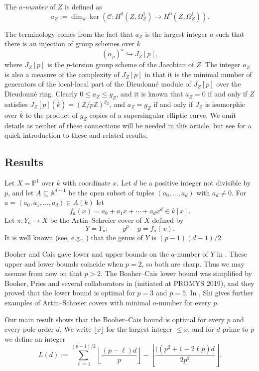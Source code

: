 \documentclass[12pt,reqno]{amsart}
\numberwithin{equation}{section}
\theoremstyle{plain}
\theoremstyle{definition}
\theoremstyle{remark}
\numberwithin{equation}{section}
\newcommand{\CC}{\mathcal{C}}
\newcommand{\kbar}{{\overline{k}}}
\newcommand{\Z}{\mathbb{Z}}
\newcommand{\A}{\mathbb{A}}
\renewcommand{\P}{\mathbb{P}}
\newcommand{\<}{\langle}
\renewcommand{\>}{\rangle}
\newcommand{\into}{\hookrightarrow}
\begin{document}
The \emph{$a$-number} of $Z$ is defined as
\[a_Z:=\dim_k\ker\left(\CC: H^0(Z,\Omega^1_Z)
    \to H^0(Z,\Omega^1_Z)\right).\]

The terminology comes from the fact that $a_Z$ is the largest integer
$a$ such that there is an injection of group schemes over $k$
\[\left(\alpha_p\right)^a\into J_Z[p],\]
where $J_Z[p]$ is the $p$-torsion group scheme of the Jacobian of $Z$.
The integer $a_Z$ is also a measure of the complexity of $J_Z[p]$ in
that it is the minimal number of generators of the local-local part of
the Dieudonn\'e module of $J_Z[p]$ over the Dieudonn\'e ring.  Clearly
$0\le a_Z\le g_Z$, and it is known that $a_Z=0$ if and only if $Z$
satisfies $J_Z[p](\kbar)=(\Z/p\Z)^{g_Z}$, and $a_Z=g_Z$ if and only if
$J_Z$ is isomorphic over $\kbar$ to the product of $g_Z$ copies of a
supersingular elliptic curve.
We omit details as neither of these connections will be needed in this
article, but see \cite{Pries08} for a quick introduction to these and
related results.

\subsection{Results}
Let $X=\P^1$ over $k$ with coordinate $x$.  Let $d$ be a positive
integer not divisible by $p$, and let $A\subseteq\A^{d+1}$ be the open
subset of tuples $(a_0,\dots,a_d)$ with $a_d\neq0$.  For
$a=(a_0,a_1,\dots,a_d)\in A(k)$ let
\[f_a(x)=a_0+a_1x+\cdots+a_dx^d\in k[x].\]
Let $\pi:Y_a\to X$ be the Artin--Schreier cover of $X$ defined by
\[Y=Y_a:\qquad y^p-y=f_a(x).\]
It is well known (see, e.g., \cite[Prop.~6.4.1]{StichtenothAFFC}) that
the genus of $Y$ is $(p-1)(d-1)/2$. 

Booher and Cais gave lower and upper bounds on the $a$-number of $Y$
in \cite{BooherCais20}.  These upper and lower bounds coincide when
$p=2$, so both are sharp.  Thus we may assume from now on that $p>2$.
The Booher--Cais lower bound was simplified by Booher, Pries and
several collaborators in \cite{BooherPriesetal22} (initiated at PROMYS
2019), and they proved that the lower bound is optimal for $p=3$ and
$p=5$.  In \cite{Shi26}, Shi gives further examples of Artin--Schreier
covers with minimal $a$-number for every $p$. 

Our main result shows that the Booher--Cais bound is optimal for every
$p$ and every pole order $d$.  We write $\lfloor x \rfloor$ for the
largest integer $\le x$, and for $d$ prime to $p$ we define an integer
\[L(d):=\sum_{\ell=1}^{(p-1)/2}
    \left\lfloor\frac{(p-\ell)d}{p}\right\rfloor
    -\left\lfloor\frac{((p^2+1-2\ell p)d}{2p^2}\right\rfloor.\]
\end{document}
